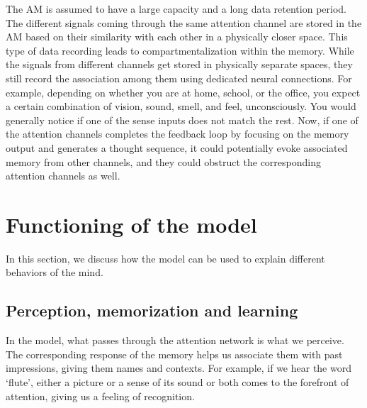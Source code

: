 \documentclass[reprint,amsmath,amssymb,apr,aip,onecolumn, 11pt]{revtex4-1}
\begin{document}
		
	The AM is assumed to have a large capacity and a long data retention period. The different signals coming through the same attention channel are stored in the AM based on their similarity with each other in a physically closer space. This type of data recording leads to compartmentalization within the memory. While the signals from different channels get stored in physically separate spaces, they still record the association among them using dedicated neural connections. For example, depending on whether you are at home, school, or the office, you expect a certain combination of vision, sound, smell, and feel, unconsciously. You would generally notice if one of the sense inputs does not match the rest. Now, if one of the attention channels completes the feedback loop by focusing on the memory output and generates a thought sequence, it could potentially evoke associated memory from other channels, and they could obstruct the corresponding attention channels as well.
	
	
		
		
		 
	
		

\section{Functioning of the model}
In this section, we discuss how the model can be used to explain different behaviors of the mind. 



\subsection{Perception, memorization and learning}

In the model, what passes through the attention network is what we perceive. The corresponding response of the memory helps us associate them with past impressions, giving them names and contexts. For example, if we hear the word `flute', either a picture or a sense of its sound or both comes to the forefront of attention, giving us a feeling of recognition. 
\end{document}
